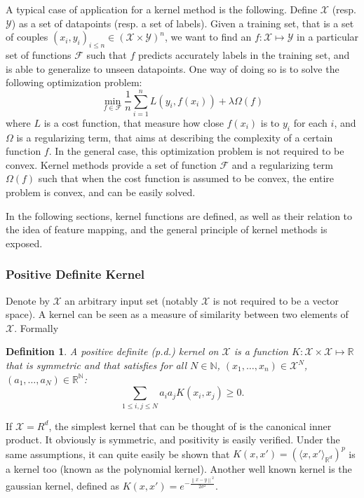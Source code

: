 \documentclass[a4paper, 11pt]{article}
\newtheorem{definition}{Definition}
\newcommand{\X}{\mathcal{X}}
\newcommand{\Y}{\mathcal{Y}}
\newcommand{\F}{\mathcal{F}}
\newcommand{\R}{\mathbb{R}}
\newcommand{\N}{\mathbb{N}}
\newcommand{\x}{x_i}
\newcommand{\y}{y_i}
\newcommand{\inner}[2]{\langle #1 , #2 \rangle_{\R^d}}
\newcommand{\norm}[1]{\left\| #1 \right\|}
\begin{document}
A typical case of application for a kernel method is the following. Define
$\X$ (resp. $\Y$) as a set of datapoints (resp. a set of labels). Given
a training set, that is a set of couples $(\x, \y)_{i\leq n} \in (\X \times \Y)^n$,
we want to find an $f : \X \mapsto \Y$ in a particular set of functions $\F$ such
that $f$ predicts accurately labels in the training set, and is able to generalize
to unseen datapoints. One way of doing so is to solve the following optimization
problem:
\begin{equation}
  \min\limits_{f\in\F} \frac{1}{n}\sum\limits_{i=1}^nL(\y,f(\x)) + \lambda\Omega(f)
\end{equation}
where $L$ is a cost function, that measure how close $f(\x)$ is to $\y$ for each
$i$, and $\Omega$ is a regularizing term, that aims at describing the complexity
of a certain function $f$. In the general case, this optimization problem is not required
to be convex. Kernel methods provide a set of function $\F$ and a regularizing term
$\Omega(f)$ such that when the cost function is assumed to be convex, the entire
problem is convex, and can be easily solved.

In the following sections, kernel functions are defined, as well as their
relation to the idea of feature mapping, and the general principle of kernel
methods is exposed.

\subsubsection{Positive Definite Kernel}
\label{subsub:psd}
Denote by $\X$ an arbitrary input set (notably $\X$ is not required to be a vector
space). A kernel can be seen as a measure of similarity between two elements of $\X$.
Formally
\begin{definition}
  A positive definite (p.d.) kernel on $\X$ is a function $K:\X\times\X \mapsto \R$ that
  is symmetric and that satisfies for all $N \in \N$, $(x_1, \dots, x_n) \in \X^N$,
  $(a_1, \dots, a_N) \in \R^\N$:
  \begin{equation}
    \sum\limits_{1 \leq i, j \leq N}a_ia_jK(x_i,x_j) \geq 0.
  \end{equation}
\end{definition}
If $\X = R^d$, the simplest kernel that can be thought of
is the canonical inner product. It obviously is symmetric, 
and positivity is easily verified. 
Under the same assumptions, it can quite easily be shown
that $K(x, x') = (\inner{x}{x'})^p$ is a kernel too (known
as the polynomial kernel). Another well known kernel is 
the gaussian kernel, defined as $K(x, x') = e^{- \frac{\norm{x-y}^2}{2\sigma^2}}$.
\end{document}
